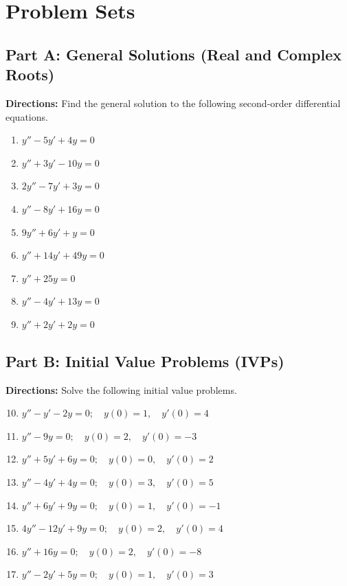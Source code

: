 \documentclass[11pt]{article}
\begin{document}
\newpage

\section{Problem Sets}

\subsection*{Part A: General Solutions (Real and Complex Roots)}
\textbf{Directions:} Find the general solution to the following second-order differential equations.
\begin{enumerate}
    \item $y'' - 5y' + 4y = 0$
    \item $y'' + 3y' - 10y = 0$
    \item $2y'' - 7y' + 3y = 0$
    \item $y'' - 8y' + 16y = 0$
    \item $9y'' + 6y' + y = 0$
    \item $y'' + 14y' + 49y = 0$
    \item $y'' + 25y = 0$
    \item $y'' - 4y' + 13y = 0$
    \item $y'' + 2y' + 2y = 0$
\end{enumerate}

\subsection*{Part B: Initial Value Problems (IVPs)}
\textbf{Directions:} Solve the following initial value problems.
\begin{enumerate}
    \setcounter{enumi}{9}
    \item $y'' - y' - 2y = 0; \quad y(0) = 1, \quad y'(0) = 4$
    \item $y'' - 9y = 0; \quad y(0) = 2, \quad y'(0) = -3$
    \item $y'' + 5y' + 6y = 0; \quad y(0) = 0, \quad y'(0) = 2$
    \item $y'' - 4y' + 4y = 0; \quad y(0) = 3, \quad y'(0) = 5$
    \item $y'' + 6y' + 9y = 0; \quad y(0) = 1, \quad y'(0) = -1$
    \item $4y'' - 12y' + 9y = 0; \quad y(0) = 2, \quad y'(0) = 4$
    \item $y'' + 16y = 0; \quad y(0) = 2, \quad y'(0) = -8$
    \item $y'' - 2y' + 5y = 0; \quad y(0) = 1, \quad y'(0) = 3$
\end{enumerate}
\end{document}

